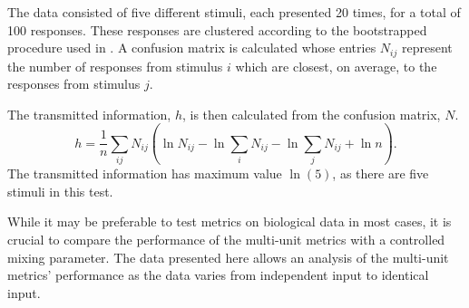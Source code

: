 The data consisted of five different stimuli, each presented 20 times, for a total of 100 responses.  These responses are clustered according to the bootstrapped procedure used in \citep{VictorPurpura1996a}. A confusion matrix is calculated whose entries $N_{ij}$ represent the number of responses from stimulus $i$ which are closest, on average, to the responses from stimulus $j$.


The transmitted information, $h$, is then calculated from the confusion matrix, $N$.
\begin{equation}
h = \frac{1}{n} \sum_{ij}N_{ij} \left( \ln N_{ij} - \ln \sum_i N_{ij} - \ln \sum_j N_{ij} + \ln n\right) .
\end{equation}
The transmitted information has maximum value $\ln(5)$, as there are five stimuli in this test.
 
While it may be preferable to test metrics on biological data in most cases, it is crucial to compare the performance of the multi-unit metrics with a controlled mixing parameter.  The data presented here allows an analysis of the multi-unit metrics' performance as the data varies from independent input to identical input.


